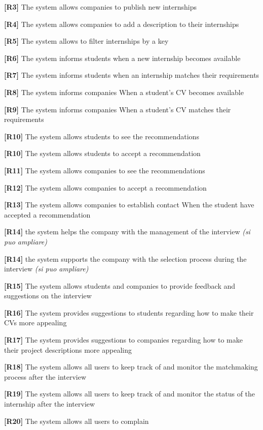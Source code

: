 \textbf{[R3]} The system allows companies to publish new internships

\textbf{[R4]} The system allows companies to add a description to their internships

\textbf{[R5]} The system allows to filter internships by a key

\textbf{[R6]} The system informs students when a new internship becomes available

\textbf{[R7]} The system informs students when an internship matches their requirements 

\textbf{[R8]} The system informs companies When a student's CV becomes available

\textbf{[R9]} The system informs companies When a student's CV matches  their requirements

\textbf{[R10]} The system allows students to see the recommendations

\textbf{[R10]} The system allows students to accept a recommendation

\textbf{[R11]} The system allows companies to see the recommendations

\textbf{[R12]} The system allows companies to accept a recommendation 

\textbf{[R13] } The system allows companies to establish contact When the student have accepted a recommendation

\textbf{[R14]} the system helps the company with the management of the interview \textit{(si puo ampliare)}

\textbf{[R14]} the system supports the company with the selection process during the interview \textit{(si puo ampliare)}

\textbf{[R15]} The system allows students and companies to provide feedback and suggestions on the interview

\textbf{[R16] }The system provides suggestions to students regarding how to make their CVs more appealing

\textbf{[R17]} The system provides suggestions to companies regarding how to make their project descriptions more appealing

\textbf{[R18]} The system allows all users to keep track of and monitor the matchmaking process after the interview

\textbf{[R19]} The system allows all users to keep track of and monitor the status of the internship after the interview

\textbf{[R20]} The system allows all users to complain 

